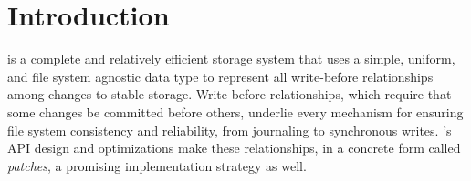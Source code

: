 
\section {Introduction}
\label{sec:intro}

\begin{comment}
This paper aims to evaluate whether a simple, unified abstraction that
represents all modifications to stable storage, including
\emph{dependencies} among modifications, can be used to efficiently
implement a complete file system layer, where modifications are common
and cache sizes are large.
%
The answer is a qualified yes.
\end{comment}


\emph{\Featherstitch} is a complete and relatively efficient storage system
 that uses
 a simple, uniform, and file system agnostic data type to represent
 all write-before relationships among changes to stable
 storage.
%
Write-before relationships, which require that some changes be committed
 before others, underlie every mechanism for ensuring file system
 consistency and reliability, from journaling to synchronous writes.
%
\Kudos's API design and optimizations make these relationships, in a concrete form
 called \emph{patches}, a promising implementation strategy as well.


\begin{comment}
As file system functionality increases, maintaining file system
 correctness in the presence of failures is increasingly a focus of
 research~\cite{sivathanuetal05-logic,denehyetal05-journal-guided}.
%
File systems today deal with many challenges that make implementing this
 property difficult: power losses, software failures, and even user
 intervention all pose significant threats.
%
To meet this challenge, file systems use a variety of techniques, like
 journaling and soft updates.
%
These mechanisms are each based on imposing some write-before
 relationship among buffered changes to the data in stable storage.
%
The answer is a qualified yes.
\end{comment}


